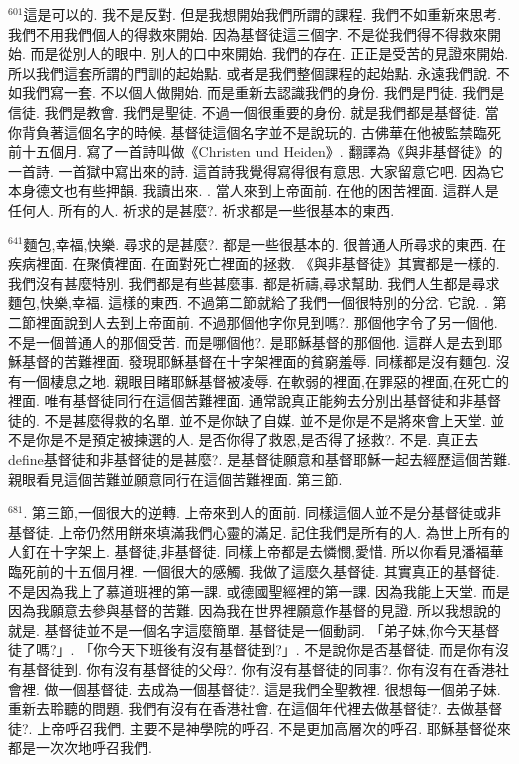 \documentclass{book}
\begin{document}
$^{601}$這是可以的.
我不是反對.
但是我想開始我們所謂的課程.
我們不如重新來思考.
我們不用我們個人的得救來開始.
因為基督徒這三個字.
不是從我們得不得救來開始.
而是從別人的眼中.
別人的口中來開始.
我們的存在.
正正是受苦的見證來開始.
所以我們這套所謂的門訓的起始點.
或者是我們整個課程的起始點.
永遠我們說.
不如我們寫一套.
不以個人做開始.
而是重新去認識我們的身份.
我們是門徒.
我們是信徒.
我們是教會.
我們是聖徒.
不過一個很重要的身份.
就是我們都是基督徒.
當你背負著這個名字的時候.
基督徒這個名字並不是說玩的.
古佛華在他被監禁臨死前十五個月.
寫了一首詩叫做《Christen und Heiden》.
翻譯為《與非基督徒》的一首詩.
一首獄中寫出來的詩.
這首詩我覺得寫得很有意思.
大家留意它吧.
因為它本身德文也有些押韻.
我讀出來.
.
當人來到上帝面前.
在他的困苦裡面.
這群人是任何人.
所有的人.
祈求的是甚麼?.
祈求都是一些很基本的東西.

$^{641}$麵包,幸福,快樂.
尋求的是甚麼?.
都是一些很基本的.
很普通人所尋求的東西.
在疾病裡面.
在聚債裡面.
在面對死亡裡面的拯救.
《與非基督徒》其實都是一樣的.
我們沒有甚麼特別.
我們都是有些甚麼事.
都是祈禱,尋求幫助.
我們人生都是尋求麵包,快樂,幸福.
這樣的東西.
不過第二節就給了我們一個很特別的分岔.
它說.
.
第二節裡面說到人去到上帝面前.
不過那個他字你見到嗎?.
那個他字令了另一個他.
不是一個普通人的那個受苦.
而是哪個他?.
是耶穌基督的那個他.
這群人是去到耶穌基督的苦難裡面.
發現耶穌基督在十字架裡面的貧窮羞辱.
同樣都是沒有麵包.
沒有一個棲息之地.
親眼目睹耶穌基督被凌辱.
在軟弱的裡面,在罪惡的裡面,在死亡的裡面.
唯有基督徒同行在這個苦難裡面.
通常說真正能夠去分別出基督徒和非基督徒的.
不是甚麼得救的名單.
並不是你缺了自媒.
並不是你是不是將來會上天堂.
並不是你是不是預定被揀選的人.
是否你得了救恩,是否得了拯救?.
不是.
真正去define基督徒和非基督徒的是甚麼?.
是基督徒願意和基督耶穌一起去經歷這個苦難.
親眼看見這個苦難並願意同行在這個苦難裡面.
第三節.

$^{681}$.
第三節,一個很大的逆轉.
上帝來到人的面前.
同樣這個人並不是分基督徒或非基督徒.
上帝仍然用餅來填滿我們心靈的滿足.
記住我們是所有的人.
為世上所有的人釘在十字架上.
基督徒,非基督徒.
同樣上帝都是去憐憫,愛惜.
所以你看見潘福華臨死前的十五個月裡.
一個很大的感觸.
我做了這麼久基督徒.
其實真正的基督徒.
不是因為我上了慕道班裡的第一課.
或德國聖經裡的第一課.
因為我能上天堂.
而是因為我願意去參與基督的苦難.
因為我在世界裡願意作基督的見證.
所以我想說的就是.
基督徒並不是一個名字這麼簡單.
基督徒是一個動詞.
「弟子妹,你今天基督徒了嗎?」.
「你今天下班後有沒有基督徒到?」.
不是說你是否基督徒.
而是你有沒有基督徒到.
你有沒有基督徒的父母?.
你有沒有基督徒的同事?.
你有沒有在香港社會裡.
做一個基督徒.
去成為一個基督徒?.
這是我們全聖教裡.
很想每一個弟子妹.
重新去聆聽的問題.
我們有沒有在香港社會.
在這個年代裡去做基督徒?.
去做基督徒?.
上帝呼召我們.
主要不是神學院的呼召.
不是更加高層次的呼召.
耶穌基督從來都是一次次地呼召我們.
\end{document}
